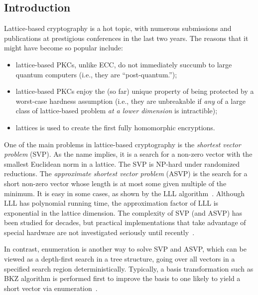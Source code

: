 %
%




\begin{CJK}{Bg5}{bsmi}
\chapter{Introduction}
\label{sec:intro}

Lattice-based cryptography is a hot topic, with numerous submissions
and publications at prestigious conferences in the last two years.
%
The reasons that it might have become so popular include:
\begin{itemize}
\item lattice-based PKCs, unlike ECC, do not immediately succumb to
  large quantum computers (i.e., they are ``post-quantum.'');
\item lattice-based PKCs enjoy the (so far) unique property of being
  protected by a worst-case hardness assumption (i.e., they are
  unbreakable if \emph{any} of a large class of lattice-based problem
  \emph{at a lower dimension} is intractible)\cite{Ajtai:97, Micciancio:Regev:07};
\item lattices is used to create the first fully homomorphic encryptions\cite{Gentry:09}.
\end{itemize}


One of the main problems in lattice-based cryptography is the
\emph{shortest vector problem} (SVP).
%
As the name implies, it is a search for a non-zero vector with the
smallest Euclidean norm in a lattice.
%
The SVP is NP-hard under randomized reductions.
%
The \emph{approximate shortest vector problem} (ASVP) is the search
for a short non-zero vector whose length is at most some given
multiple of the minimum.
%
It is easy in some cases, as shown by the LLL algorithm~\cite{LLL:1982}.
%
Although LLL has polynomial running time, the approximation factor of
LLL is exponential in the lattice dimension.
%
The complexity of SVP (and ASVP) has been studied for decades, but
practical implementations that take advantage of special hardware are
not investigated seriously until
recently~\cite{DBLP:conf/africacrypt/HermansSBVP10,DagdelenS10,DetreyHPS10}.

In contrast, enumeration is another way to solve SVP and ASVP, which
can be viewed as a depth-first search in a tree structure, going over
all vectors in a specified search region deterministically.
%
Typically, a basis transformation such as BKZ algorithm is performed first to
improve the basis to one likely to yield a short vector via
enumeration~\cite{SchnorrE1994}.


\end{CJK}
